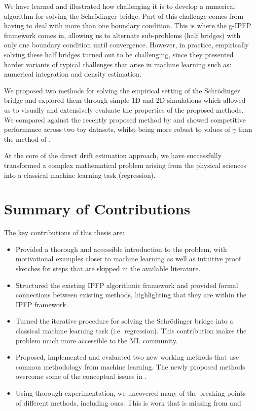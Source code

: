 \documentclass[a4paper,12pt,twoside,openright]{report}
\theoremstyle{definition}
\begin{document}
We have learned and illustrated how challenging it is to develop a numerical algorithm for solving the Schrödinger bridge. Part of this challenge comes from having to deal with more than one boundary condition. This is where the g-IPFP framework comes in, allowing us to alternate sub-problems (half bridges) with only one boundary condition until convergence. However, in practice, empirically solving these half bridges turned out to be challenging, since they presented harder variants of typical challenges that arise in machine learning such as: numerical integration and density estimation.

We proposed two methods for solving the empirical setting of the Schrödinger bridge and explored them through simple 1D and 2D simulations which allowed us to visually and extensively evaluate the properties of the proposed methods.  We compared against the recently proposed method by \cite{pavon2018data} and showed competitive performance across two toy datasets, whilst being more robust to values of $\gamma$ than the method of \citep{pavon2018data}.

At the core of the direct drift estimation approach, we have successfully transformed a complex mathematical problem arising from the physical sciences into a classical machine learning task (regression).

\section{Summary of Contributions}

The key contributions of this thesis are:

\begin{itemize}
    \item Provided a thorough and accessible introduction to the problem, with motivational examples closer to machine learning as well as intuitive proof sketches for steps that are skipped in the available literature.
    \item Structured the existing IPFP algorithmic framework and provided formal connections between existing methods, highlighting that they are within the IPFP framework.
    \item Turned the iterative procedure for solving the Schrödinger bridge into a classical machine learning task (i.e. regression). This contribution makes the problem much more accessible to the ML community.
    \item Proposed, implemented and evaluated two new working methods that use common methodology from machine learning. The newly proposed methods overcome some of the conceptual issues in \cite{pavon2018data}.
    \item Using thorough experimentation, we uncovered many of the breaking points of different methods, including ours. This is work that is missing from \cite{pavon2018data} and \cite{bernton2019schr}
\end{itemize}
\end{document}
